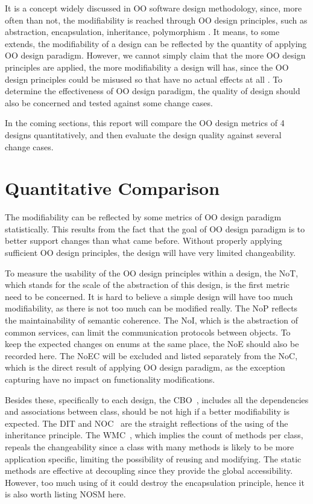 \documentclass[conference]{IEEEtran}
\begin{document}
	It is a concept widely discussed in \gls{OO} software design methodology, since, more often than not, the modifiability is reached through \gls{OO} design principles, such as abstraction, encapsulation, inheritance, polymorphism \cite{4}. It means, to some extends, the modifiability of a design can be reflected by the quantity of applying \gls{OO} design paradigm. However, we cannot simply claim that the more \gls{OO} design principles are applied, the more modifiability a design will has, since the \gls{OO} design principles could be misused so that have no actual effects at all \cite{3}. To determine the effectiveness of \gls{OO} design paradigm, the quality of design should also be concerned and tested against some change cases.
	
	In the coming sections, this report will compare the \gls{OO} design metrics of 4 designs quantitatively, and then evaluate the design quality against several change cases.
	
	\section{Quantitative Comparison}
	The modifiability can be reflected by some metrics of \gls{OO} design paradigm statistically. This results from the fact that the goal of \gls{OO} design paradigm is to better support changes than what came before. Without properly applying sufficient \gls{OO} design principles, the design will have very limited changeability.
	
	To measure the usability of the \gls{OO} design principles within a design, the \gls{NoT}, which stands for the scale of the abstraction of this design, is the first metric need to be concerned. It is hard to believe a simple design will have too much modifiability, as there is not too much can be modified really. The \gls{NoP} reflects the maintainability of semantic coherence. The \gls{NoI}, which is the abstraction of common services, can limit the communication protocols between objects. To keep the expected changes on enums at the same place, the \gls{NoE} should also be recorded here. The \gls{NoEC} will be excluded and listed separately from the \gls{NoC}, which is the direct result of applying \gls{OO} design paradigm, as the exception capturing have no impact on functionality modifications. 
	
	Besides these, specifically to each design, the \gls{CBO}~\cite{1}, includes all the dependencies and associations between class, should be not high if a better modifiability is expected. The \gls{DIT} and \gls{NOC}~\cite{1} are the straight reflections of the using of the inheritance principle. The \gls{WMC}~\cite{1}, which implies the count of methods per class, repeals the changeability since a class with many methods is likely to be more application specific, limiting the possibility of reusing and modifying. The static methods are effective at decoupling since they provide the global accessibility. However, too much using of it could destroy the encapsulation principle, hence it is also worth listing \gls{NOSM} here.  
	
\end{document}
